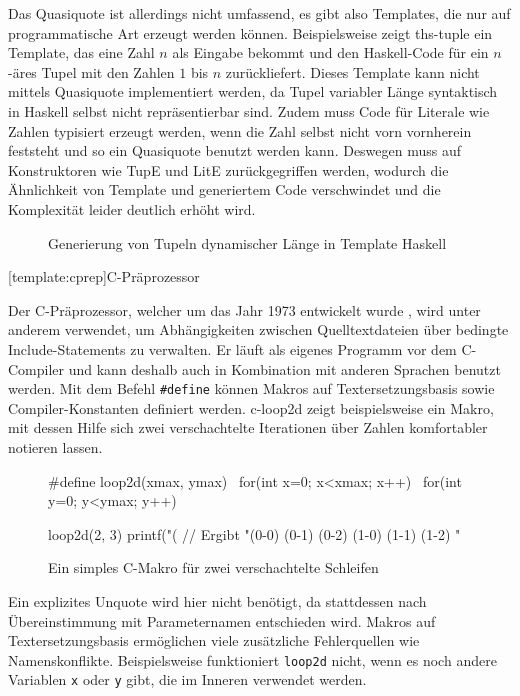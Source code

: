 \documentclass[12pt, a4paper, bibgerm]{scrbook}
\newenvironment{DIFnomarkup}{}{}
\newcommand\icode[1]{\lstinline?#1?}
\newcommand\lsection{}
\newcommand\abb{}
\begin{document}
Das Quasiquote ist allerdings nicht umfassend, es gibt also Templates, die
nur auf programmatische Art erzeugt werden können. Beispielsweise zeigt
\abb{ths-tuple} ein Template, das eine Zahl $n$ als Eingabe bekommt und
den Haskell-Code für ein $n$-äres Tupel mit den Zahlen $1$ bis $n$
zurückliefert. Dieses Template kann nicht mittels Quasiquote implementiert
werden, da Tupel variabler Länge syntaktisch in Haskell selbst nicht
repräsentierbar sind. Zudem muss Code für Literale wie Zahlen typisiert
erzeugt werden, wenn die Zahl selbst nicht vorn vornherein feststeht und
so ein Quasiquote benutzt werden kann. Deswegen muss auf Konstruktoren wie
TupE und LitE zurückgegriffen werden, wodurch die Ähnlichkeit von
Template und generiertem Code verschwindet und die Komplexität leider
deutlich erhöht wird.

\begin{figure}[h]
  \centering
  \begin{DIFnomarkup}\end{DIFnomarkup} %
  \caption{Generierung von Tupeln dynamischer Länge in Template Haskell}
  \label{magicl:fig:ths-tuple}
\end{figure}

\lsection[template:cprep]{C-Präprozessor}

Der C-Präprozessor, welcher um das Jahr 1973 entwickelt
wurde \cite{CPrep}, wird unter anderem verwendet, um Abhängigkeiten
zwischen Quelltextdateien über bedingte Include-Statements zu
verwalten. Er läuft als eigenes Programm vor dem C-Compiler und kann
deshalb auch in Kombination mit anderen Sprachen benutzt werden. Mit
dem Befehl \icode{#define} können Makros auf Textersetzungsbasis sowie
Compiler-Konstanten definiert werden. \abb{c-loop2d} zeigt
beispielsweise ein Makro, mit dessen Hilfe sich zwei verschachtelte
Iterationen über Zahlen komfortabler notieren lassen.
\begin{figure}[h]
  \centering
  \begin{DIFnomarkup}\begin{code}
#define loop2d(xmax, ymax)   \
  for(int x=0; x<xmax; x++)  \
   for(int y=0; y<ymax; y++)

loop2d(2, 3) {
  printf("(%
}
// Ergibt "(0-0) (0-1) (0-2) (1-0) (1-1) (1-2) "
  \end{code}\end{DIFnomarkup}
\caption{Ein simples C-Makro für zwei verschachtelte Schleifen}
  \label{magicl:fig:c-loop2d}
\end{figure}
Ein explizites Unquote wird hier nicht benötigt, da stattdessen nach
Übereinstimmung mit Parameternamen entschieden wird. Makros auf
Textersetzungsbasis ermöglichen viele zusätzliche Fehlerquellen wie
Namenskonflikte. Beispielsweise funktioniert \icode{loop2d} nicht, wenn
es noch andere Variablen \icode{x} oder \icode{y} gibt, die im Inneren
verwendet werden.
\end{document}
